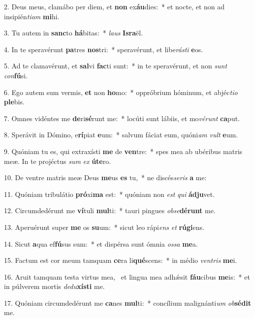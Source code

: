 2. Deus meus, clamábo per diem, et \textbf{non} ex\textbf{áu}dies:~*  et nocte, et non ad insipién\textit{ti}\textit{am} \textbf{mi}hi.\

3. Tu autem in \textbf{sanc}to \textbf{há}bitas:~*  \textit{laus} \textbf{Is}\textbf{ra}ël.\

4. In te speravérunt \textbf{pa}tres \textbf{nos}tri:~*  speravérunt, et libe\textit{rás}\textit{ti} \textbf{e}os.\

5. Ad te clamavérunt, et \textbf{sal}vi \textbf{fac}ti sunt:~*  in te speravérunt, et non \textit{sunt} \textit{con}\textbf{fú}si.\

6. Ego autem sum vermis, \textbf{et} non \textbf{ho}mo:~*  oppróbrium hóminum, et abjéc\textit{ti}\textit{o} \textbf{ple}bis.\

7. Omnes vidéntes me \textbf{de}ri\textbf{sé}runt me:~*  locúti sunt lábiis, et mo\textit{vé}\textit{runt} \textbf{ca}put.\

8. Sperávit in Dómino, e\textbf{rí}piat \textbf{e}um:~*  salvum fáciat eum, quóni\textit{am} \textit{vult} \textbf{e}um.\

9. Quóniam tu es, qui extraxísti \textbf{me} de \textbf{ven}tre:~*  spes mea ab ubéribus matris meæ. In te projéctus \textit{sum} \textit{ex} \textbf{ú}\textbf{te}ro.\

10. De ventre matris meæ Deus \textbf{me}us \textbf{es} tu,~*  ne discés\textit{se}\textit{ris} \textbf{a} me:\

11. Quóniam tribulátio \textbf{pró}xi\textbf{ma} est:~*  quóniam non \textit{est} \textit{qui} \textbf{ád}\textbf{ju}vet.\

12. Circumdedérunt me \textbf{ví}tuli \textbf{mul}ti:~*  tauri pingues \textit{ob}\textit{se}\textbf{dé}\textbf{runt} me.\

13. Aperuérunt super \textbf{me} os \textbf{su}um:~*  sicut leo rápi\textit{ens} \textit{et} \textbf{rú}\textbf{gi}ens.\

14. Sicut \textbf{a}qua ef\textbf{fú}sus sum:~*  et dispérsa sunt ómnia \textit{os}\textit{sa} \textbf{me}a.\

15. Factum est cor meum tamquam \textbf{ce}ra li\textbf{qué}scens:~*  in médio \textit{ven}\textit{tris} \textbf{me}i.\

16. Aruit tamquam testa virtus mea, \dag\  et lingua mea adhǽsit \textbf{fáu}cibus \textbf{me}is:~*  et in púlverem mortis \textit{de}\textit{du}\textbf{xís}\textbf{ti} me.\

17. Quóniam circumdedérunt me \textbf{ca}nes \textbf{mul}ti:~*  concílium malignánti\textit{um} \textit{ob}\textbf{sé}\textbf{dit} me.\

